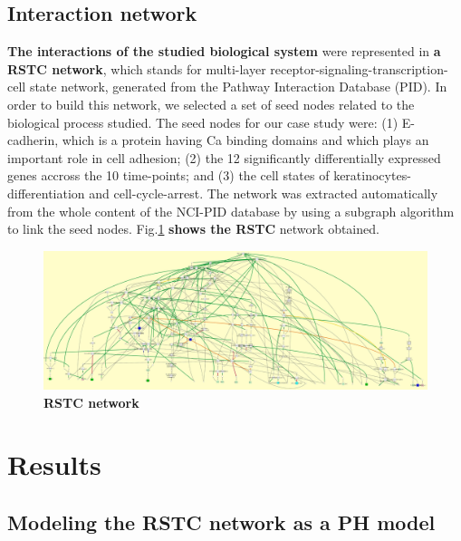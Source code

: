 \documentclass[11pt,a4paper,twoside]{epig}
\begin{document}
\subsection{Interaction network}
\label{ssec:RSTC}
\textbf{The interactions of the studied biological system}  were represented in
 \textbf{a RSTC network}, which stands for  multi-layer receptor-signaling-transcription-cell state network, generated from the Pathway Interaction Database (PID).
In order to build this network, we selected a set of seed nodes related to the biological process studied.
The seed nodes for our case study were:  (1) E-cadherin, which is a protein having Ca binding domains and which plays an important role in cell adhesion;
(2) the 12 significantly differentially expressed genes accross the 10 time-points; and (3) the cell states of keratinocytes-differentiation and cell-cycle-arrest. 
The network was extracted automatically from the whole content of the NCI-PID database by using a subgraph algorithm to link the seed nodes\cite{guziolowski2012automatic}. 
Fig.\ref{fig:network}  \textbf{shows the RSTC} network obtained.

\begin{figure}
 \centering
 \includegraphics[width=13cm]{net.jpg}
\caption{{\bf RSTC network}} 
 \label{fig:network}
\end{figure}


\section{Results}


\subsection{Modeling the RSTC network as a PH model}

\end{document}
